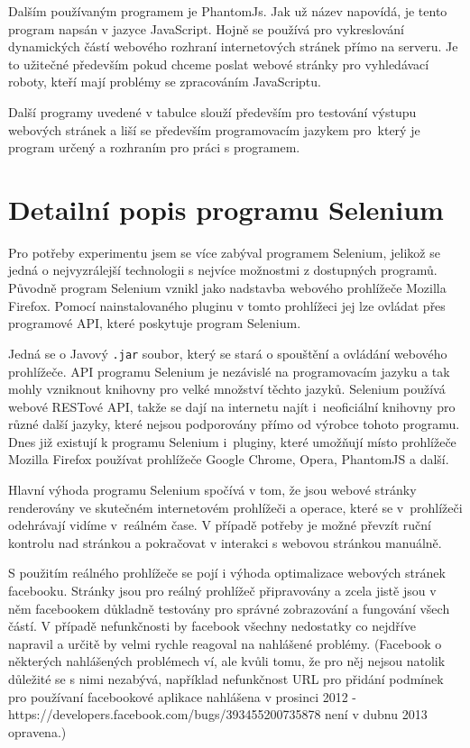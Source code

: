 \documentclass[thesis=M,czech]{FITthesis}[2013/05/10]
\begin{document}
Dalším používaným programem je PhantomJs. Jak už název napovídá, je tento program napsán v jazyce JavaScript. Hojně se používá pro vykreslování dynamických částí webového rozhraní internetových stránek přímo na serveru. Je to užitečné především pokud chceme poslat webové stránky pro vyhledávací roboty, kteří mají problémy se zpracováním JavaScriptu. 

Další programy uvedené v tabulce slouží především pro testování výstupu webových stránek a liší se především programovacím jazykem pro~který je program určený a rozhraním pro práci s programem.

\section{Detailní popis programu Selenium}

Pro potřeby experimentu jsem se více zabýval programem Selenium, jelikož se jedná o nejvyzrálejší technologii s nejvíce možnostmi z dostupných programů. Původně program Selenium vznikl jako nadstavba webového prohlížeče Mozilla Firefox. Pomocí nainstalovaného pluginu v tomto prohlížeci jej lze ovládat přes programové API, které poskytuje program Selenium. 

Jedná se o Javový \verb|.jar| soubor, který se stará o spouštění a ovládání webového prohlížeče. API programu Selenium je nezávislé na programovacím jazyku a tak mohly vzniknout knihovny pro velké množství těchto jazyků. Selenium používá webové RESTové API, takže se dají na internetu najít i~neoficiální knihovny pro různé další jazyky, které nejsou podporovány přímo od výrobce tohoto programu. Dnes již existují k programu Selenium i~pluginy, které umožňují místo prohlížeče Mozilla Firefox používat prohlížeče Google Chrome, Opera, PhantomJS a další.

Hlavní výhoda programu Selenium spočívá v tom, že jsou webové stránky renderovány ve skutečném internetovém prohlížeči a operace, které se v~prohlížeči odehrávají vidíme v~reálném čase. V případě potřeby je možné převzít ruční kontrolu nad stránkou a pokračovat v interakci s webovou stránkou manuálně. 

S použitím reálného prohlížeče se pojí i výhoda optimalizace webových stránek facebooku. Stránky jsou pro reálný prohlížeč připravovány a zcela jistě jsou v něm facebookem důkladně testovány pro správné 
zobrazování a fungování všech částí. V případě nefunkčnosti by facebook všechny nedostatky co nejdříve napravil a určitě by velmi rychle reagoval na nahlášené problémy. (Facebook o některých nahlášených problémech ví, ale kvůli tomu, že pro něj nejsou natolik důležité se s nimi nezabývá, například nefunkčnost URL pro přidání podmínek pro používaní facebookové aplikace  nahlášena v prosinci 2012 - https://developers.facebook.com/bugs/393455200735878  není v dubnu 2013 opravena.) 
\end{document}
